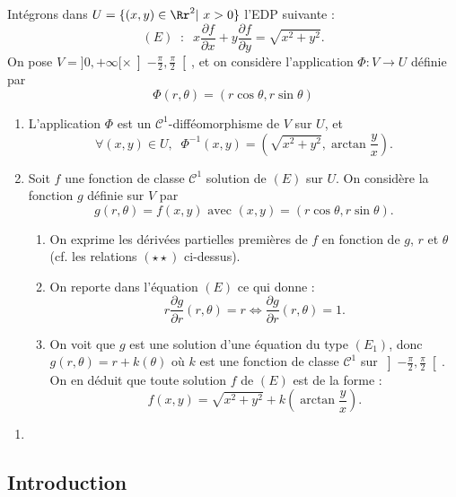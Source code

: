 \documentclass[12pt, class=report,crop=false]{standalone}
\begin{document}
\vskip6mm

Intégrons dans $U=\{(x,y)\in \Rr^2|\ x>0\}$ l'EDP suivante :
$$(E)\;\; :\; \; x\frac{\partial f}{\partial x}+y\frac{\partial f}{\partial y}=\sqrt{x^2+y^2}.$$
\rm On pose $\displaystyle V=]0,+\infty [\times \left]-\frac{\pi}{2},\frac{\pi}{2}\right[$, et on considère l'application $\Phi : V\to U$ définie par
$$\Phi (r,\theta )=(r\cos \theta,r\sin \theta )$$
\begin{enumerate}
\item L'application $\Phi$ est un ${\mathscr C}^1$-difféomorphisme de $V$ sur $U$, et
$$\forall (x,y)\in U,\; \;\Phi ^{-1}(x,y)=\left( \sqrt{x^2+y^2},\arctan\frac{y}{x}\right).$$
\item Soit $f$ une fonction de classe ${\mathscr C}^1$ solution de $(E)$ sur $U$. On considère la fonction $g$ définie sur $V$ par
$$g(r,\theta )=f(x,y)\mbox{ avec }(x,y)=(r\cos \theta,r\sin \theta ).$$
\begin{enumerate}
\item On exprime les dérivées partielles premières de $f$ en fonction de $g$, $r$ et $\theta$ (cf. les relations $(\star \star )$ ci-dessus).
\item On reporte dans l'équation $(E)$ ce qui donne :
$$r\frac{\partial g}{\partial r}(r,\theta )=r\Leftrightarrow \frac{\partial g}{\partial r}(r,\theta )=1.$$
\item On voit que $g$ est une solution d'une équation du type $(E_1)$, donc $g(r,\theta )=r+k(\theta )$ o\`u $k$ est une fonction de classe ${\mathscr C}^1$ sur $\displaystyle \left]-\frac{\pi}{2},\frac{\pi}{2}\right[$. On en déduit que toute solution $f$ de $(E)$ est de la forme :
$$\displaystyle f(x,y)=\sqrt{x^2+y^2}+k\left(\arctan \frac{y}{x}\right).$$
\end{enumerate}                 
\end{enumerate}


\begin{miniexercices}
\sauteligne
\begin{enumerate}
  \item 
\end{enumerate}
\end{miniexercices}



\subsection{Introduction}
\end{document}
